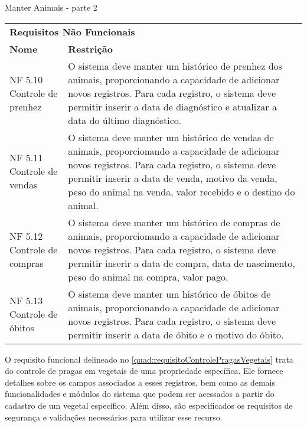 \begin{tabframed}[!htb]

  \caption{Manter Animais - parte 2}
  \label{quad:requisitoManterAnimais}
  \renewcommand{\arraystretch}{1.5}
  \begin{tabular}{|l|l|}
    \cline{1-2}

    \multicolumn{2}{|l|}{\textbf{Requisitos Não Funcionais}}
    \\ \cline{1-2}

    \textbf{Nome}                             &
    \textbf{Restrição}
    \\ \cline{1-2}
    \multicolumn{1}{|p{3cm}|}{\raggedright NF 5.10 Controle de prenhez} &
    \multicolumn{1}{|p{12cm}|}{\raggedright O sistema deve manter um histórico de prenhez dos animais, proporcionando a capacidade de adicionar novos registros. Para cada registro, o sistema deve permitir inserir a data de diagnóstico e atualizar a data do último diagnóstico.}
    \\ \cline{1-2}

    \multicolumn{1}{|p{3cm}|}{\raggedright NF 5.11 Controle de vendas } &
    \multicolumn{1}{|p{12cm}|}{\raggedright O sistema deve manter um histórico de vendas de animais, proporcionando a capacidade de adicionar novos registros. Para cada registro, o sistema deve permitir inserir a data de venda, motivo da venda, peso do animal na venda, valor recebido e o destino do animal.}
    \\ \cline{1-2}

    \multicolumn{1}{|p{3cm}|}{\raggedright NF 5.12 Controle de compras} &
    \multicolumn{1}{|p{12cm}|}{\raggedright O sistema deve manter um histórico de compras de animais, proporcionando a capacidade de adicionar novos registros. Para cada registro, o sistema deve permitir inserir a data de compra, data de nascimento, peso do animal na compra, valor pago.}
    \\ \cline{1-2}

    \multicolumn{1}{|p{3cm}|}{\raggedright NF 5.13 Controle de óbitos} &
    \multicolumn{1}{|p{12cm}|}{\raggedright O sistema deve manter um histórico de óbitos de animais, proporcionando a capacidade de adicionar novos registros. Para cada registro, o sistema deve permitir inserir a data de óbito e o motivo do óbito.}
    \\ \cline{1-2}
  \end{tabular}
  \fonte{} %
\end{tabframed}


O requisito funcional delineado no \autoref{quad:requisitoControlePragasVegetais} trata do controle de pragas em vegetais de uma propriedade específica. Ele fornece detalhes sobre os campos associados a esses registros, bem como as demais funcionalidades e módulos do sistema que podem ser acessados a partir do cadastro de um vegetal específico. Além disso, são especificados os requisitos de segurança e validações necessários para utilizar esse recurso.

